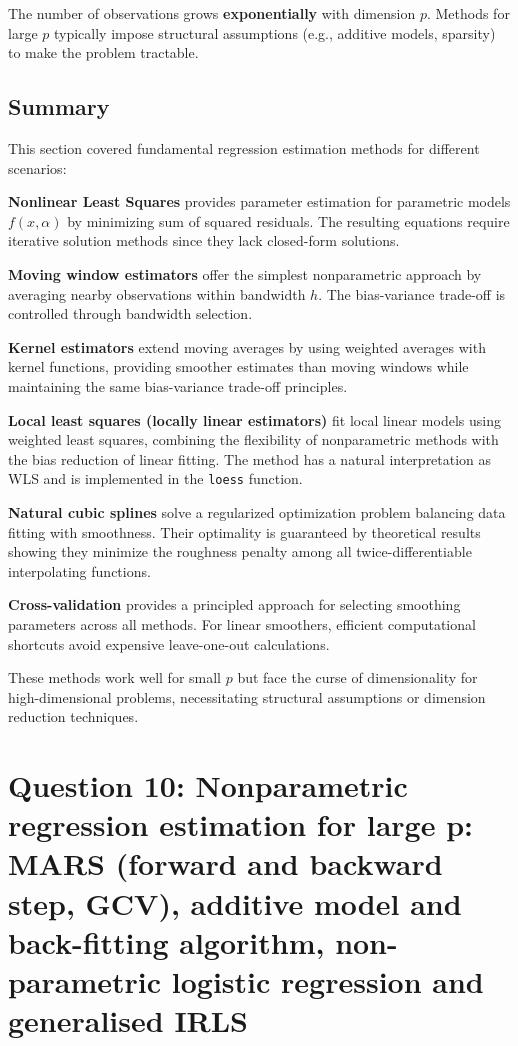 \documentclass[12pt,a4paper]{article}
\begin{document}
The number of observations grows \textbf{exponentially} with dimension $p$. Methods for large $p$ typically impose structural assumptions (e.g., additive models, sparsity) to make the problem tractable.

\subsection{Summary}

This section covered fundamental regression estimation methods for different scenarios:

\textbf{Nonlinear Least Squares} provides parameter estimation for parametric models $f(x,\alpha)$ by minimizing sum of squared residuals. The resulting equations require iterative solution methods since they lack closed-form solutions.

\textbf{Moving window estimators} offer the simplest nonparametric approach by averaging nearby observations within bandwidth $h$. The bias-variance trade-off is controlled through bandwidth selection.

\textbf{Kernel estimators} extend moving averages by using weighted averages with kernel functions, providing smoother estimates than moving windows while maintaining the same bias-variance trade-off principles.

\textbf{Local least squares (locally linear estimators)} fit local linear models using weighted least squares, combining the flexibility of nonparametric methods with the bias reduction of linear fitting. The method has a natural interpretation as WLS and is implemented in the \texttt{loess} function.

\textbf{Natural cubic splines} solve a regularized optimization problem balancing data fitting with smoothness. Their optimality is guaranteed by theoretical results showing they minimize the roughness penalty among all twice-differentiable interpolating functions.

\textbf{Cross-validation} provides a principled approach for selecting smoothing parameters across all methods. For linear smoothers, efficient computational shortcuts avoid expensive leave-one-out calculations.

These methods work well for small $p$ but face the curse of dimensionality for high-dimensional problems, necessitating structural assumptions or dimension reduction techniques.

\newpage
\section{Question 10: Nonparametric regression estimation for large p: MARS (forward and backward step, GCV), additive model and back-fitting algorithm, non-parametric logistic regression and generalised IRLS}
\end{document}
